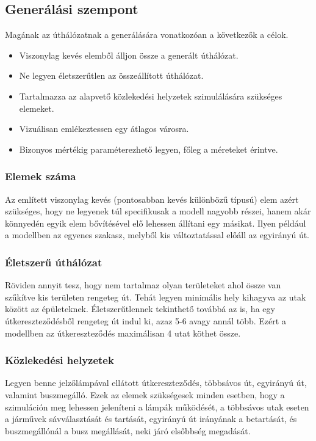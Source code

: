 
\subsection{Generálási szempont}

Magának az úthálózatnak a generálására vonatkozóan a következők a célok.
\begin{itemize}
\item Viszonylag kevés elemből álljon össze a generált úthálózat.
\item Ne legyen életszerűtlen az összeállított úthálózat.
\item Tartalmazza az alapvető közlekedési helyzetek szimulálására szükséges elemeket.
\item Vizuálisan emlékeztessen egy átlagos városra.
\item Bizonyos mértékig paraméterezhető legyen, főleg a méreteket érintve.
\end{itemize}

\subsubsection{Elemek száma}

Az említett viszonylag kevés (pontosabban kevés különbözű típusú) elem azért szükséges, hogy ne legyenek túl specifikusak a modell nagyobb részei, hanem akár könnyedén egyik elem bővítésével elő lehessen állítani egy másikat. Ilyen például a modellben az egyenes szakasz, melyből kis változtatással előáll az egyirányú út.

\subsubsection{Életszerű úthálózat}

Röviden annyit tesz, hogy nem tartalmaz olyan területeket ahol össze van szűkítve kis területen rengeteg út. Tehát legyen minimális hely kihagyva az utak között az épületeknek. Életszerűtlennek tekinthető továbbá az is, ha egy útkereszteződésből rengeteg út indul ki, azaz 5-6 avagy annál több. Ezért a modellben az útkereszteződés maximálisan 4 utat köthet össze.

\subsubsection{Közlekedési helyzetek}

Legyen benne jelzőlámpával ellátott útkereszteződés, többsávos út, egyirányú út, valamint buszmegálló. Ezek az elemek szükségesek minden esetben, hogy a szimuláción meg lehessen jeleníteni a lámpák működését, a többsávos utak eseten a járművek sávválasztását és tartását, egyirányú út irányának a betartását, és buszmegállónál a busz megállását, neki járó elsőbbség megadását.

